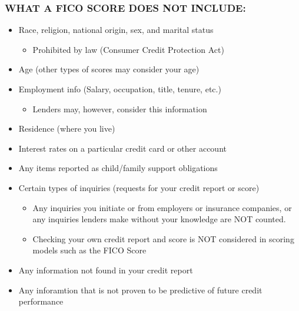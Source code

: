 \documentclass[12pt]{article}
\begin{document}
            \subsubsection{WHAT A FICO SCORE DOES NOT INCLUDE:}
                \begin{itemize}
                    \item Race, religion, national origin, sex, and marital status
                        \begin{itemize}
                            \item Prohibited by law (Consumer Credit Protection Act)
                        \end{itemize}
                    \item Age (other types of scores may consider your age)
                    \item Employment info (Salary, occupation, title, tenure, etc.)
                        \begin{itemize}
                            \item Lenders may, however, consider this information
                        \end{itemize}
                    \item Residence (where you live)
                    \item Interest rates on a particular credit card or other account
                    \item Any items reported as child/family support obligations
                    \item Certain types of inquiries (requests for your credit report or score)
                        \begin{itemize}
                            \item Any inquiries you initiate or from employers or insurance companies, or any inquiries lenders make without your knowledge
                                are NOT counted.
                            \item Checking your own credit report and score is NOT considered in scoring models such as the FICO Score
                        \end{itemize}
                    \item Any information not found in your credit report
                    \item Any inforamtion that is not proven to be predictive of future credit performance
                \end{itemize}
        
\end{document}
